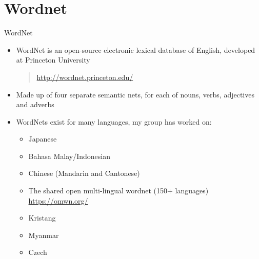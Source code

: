\section{Wordnet}

\begin{frame}{WordNet}


\begin{itemize}
\item WordNet is an open-source electronic lexical database of English,
  developed at Princeton University
  \begin{quote}
    \url{http://wordnet.princeton.edu/}
  \end{quote}
\item Made up of four separate semantic nets, for each of nouns, verbs,
  adjectives and adverbs
\item WordNets exist for many languages, my group has worked on:
  \begin{itemize}
  \item Japanese 
  \item Bahasa Malay/Indonesian
  \item Chinese (Mandarin and Cantonese)
  \item The shared open multi-lingual wordnet (150+ languages) 
    \\ \url{https://omwn.org/}
  \item Kristang
  \item Myanmar
  \item Czech
\end{itemize}
\end{itemize}
\end{frame}

